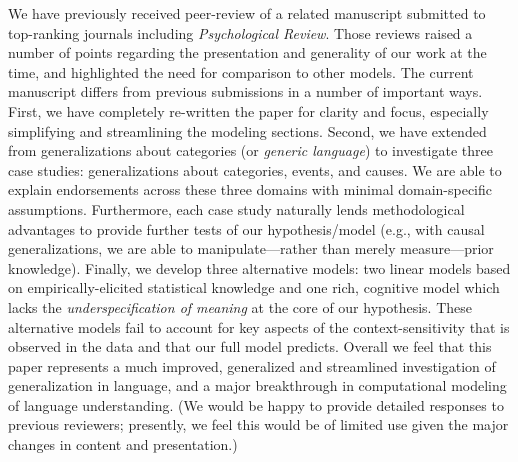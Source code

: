 \documentclass[11pt,letterpaper]{letter} %
\begin{document}
\begin{letter}
We have previously received peer-review of a related manuscript submitted to top-ranking journals including \emph{Psychological Review}.
Those reviews raised a number of points regarding the presentation and generality of our work at the time, and highlighted the need for comparison to other models. 
The current manuscript differs from previous submissions in a number of important ways.
First, we have completely re-written the paper for clarity and focus, especially simplifying and streamlining the modeling sections.
Second, we have extended from generalizations about categories (or \emph{generic language}) to investigate three case studies: generalizations about categories, events, and causes.
We are able to explain endorsements across these three domains with minimal domain-specific assumptions. 
Furthermore, each case study naturally lends methodological advantages to provide further tests of our hypothesis/model (e.g., with causal generalizations, we are able to manipulate---rather than merely measure---prior knowledge).
Finally, we develop three alternative models: two linear models based on empirically-elicited statistical knowledge and one rich, cognitive model which lacks the \emph{underspecification of meaning} at the core of our hypothesis. 
These alternative models fail to account for key aspects of the context-sensitivity that is observed in the data and that our full model predicts.
Overall we feel that this paper represents a much improved, generalized and streamlined investigation of generalization in language, and a major breakthrough in computational modeling of language understanding.
(We would be happy to provide detailed responses to previous reviewers; presently, we feel this would be of limited use given the major changes in content and presentation.)




\end{letter}
\end{document}
